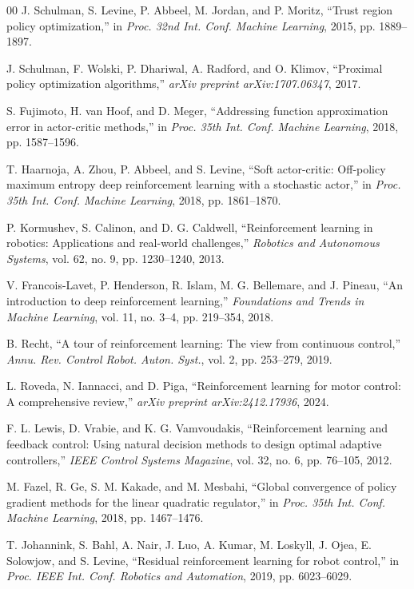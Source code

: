 \documentclass[conference]{IEEEtran}
\begin{document}
\begin{thebibliography}{00}
J. Schulman, S. Levine, P. Abbeel, M. Jordan, and P. Moritz, ``Trust region policy optimization,'' in \emph{Proc. 32nd Int. Conf. Machine Learning}, 2015, pp. 1889--1897.

J. Schulman, F. Wolski, P. Dhariwal, A. Radford, and O. Klimov, ``Proximal policy optimization algorithms,'' \emph{arXiv preprint arXiv:1707.06347}, 2017.

S. Fujimoto, H. van Hoof, and D. Meger, ``Addressing function approximation error in actor-critic methods,'' in \emph{Proc. 35th Int. Conf. Machine Learning}, 2018, pp. 1587--1596.

T. Haarnoja, A. Zhou, P. Abbeel, and S. Levine, ``Soft actor-critic: Off-policy maximum entropy deep reinforcement learning with a stochastic actor,'' in \emph{Proc. 35th Int. Conf. Machine Learning}, 2018, pp. 1861--1870.

P. Kormushev, S. Calinon, and D. G. Caldwell, ``Reinforcement learning in robotics: Applications and real-world challenges,'' \emph{Robotics and Autonomous Systems}, vol. 62, no. 9, pp. 1230--1240, 2013.

V. Francois-Lavet, P. Henderson, R. Islam, M. G. Bellemare, and J. Pineau, ``An introduction to deep reinforcement learning,'' \emph{Foundations and Trends in Machine Learning}, vol. 11, no. 3--4, pp. 219--354, 2018.

B. Recht, ``A tour of reinforcement learning: The view from continuous control,'' \emph{Annu. Rev. Control Robot. Auton. Syst.}, vol. 2, pp. 253--279, 2019.

L. Roveda, N. Iannacci, and D. Piga, ``Reinforcement learning for motor control: A comprehensive review,'' \emph{arXiv preprint arXiv:2412.17936}, 2024.

F. L. Lewis, D. Vrabie, and K. G. Vamvoudakis, ``Reinforcement learning and feedback control: Using natural decision methods to design optimal adaptive controllers,'' \emph{IEEE Control Systems Magazine}, vol. 32, no. 6, pp. 76--105, 2012.

M. Fazel, R. Ge, S. M. Kakade, and M. Mesbahi, ``Global convergence of policy gradient methods for the linear quadratic regulator,'' in \emph{Proc. 35th Int. Conf. Machine Learning}, 2018, pp. 1467--1476.

T. Johannink, S. Bahl, A. Nair, J. Luo, A. Kumar, M. Loskyll, J. Ojea, E. Solowjow, and S. Levine, ``Residual reinforcement learning for robot control,'' in \emph{Proc. IEEE Int. Conf. Robotics and Automation}, 2019, pp. 6023--6029.


\end{thebibliography}
\end{document}
